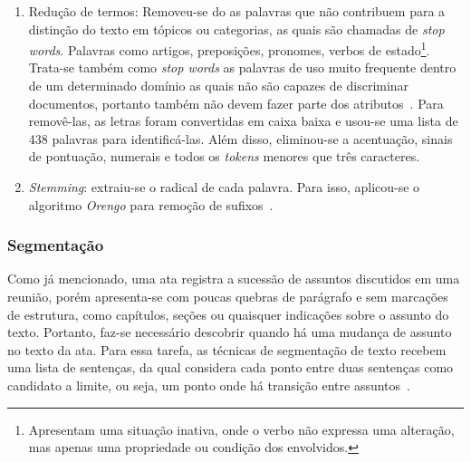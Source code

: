 \begin{enumerate}
\begin{algorithm}
	\caption{Identificação de finais de sentença}
	\label{alg:identificacaofinaisdesent}
\end{algorithm}




\item Redução de termos: Removeu-se do as palavras que não contribuem para a distinção do texto em tópicos ou categorias, as quais são chamadas de \textit{stop words}. Palavras como artigos, preposições, pronomes, verbos de estado\footnote{Apresentam uma situação inativa, onde o verbo não expressa uma alteração, mas apenas uma propriedade ou condição dos envolvidos.}. Trata-se também como \textit{stop words} as palavras de uso muito frequente dentro de um determinado domínio as quais não são capazes de discriminar documentos, portanto também não devem fazer parte dos atributos~\cite{Rezende2003}. Para removê-las, as letras foram convertidas em caixa baixa e usou-se uma lista de 438 palavras para identificá-las. Além disso, eliminou-se a acentuação, sinais de pontuação, numerais e todos os \textit{tokens} menores que três caracteres.

\item \textit{Stemming}: extraiu-se o radical de cada palavra. Para isso, aplicou-se o algoritmo \textit{Orengo} %
	para remoção de sufixos~\cite{Alvares2005}.

\end{enumerate}
	







\subsubsection{Segmentação}

Como já mencionado, uma ata registra a sucessão de assuntos discutidos em uma reunião, porém apresenta-se com poucas quebras de parágrafo e sem marcações de estrutura, como capítulos, seções ou quaisquer indicações sobre o assunto do texto. Portanto, faz-se necessário descobrir quando há uma mudança de assunto no texto da ata. Para essa tarefa, as técnicas de segmentação de texto recebem uma lista de sentenças, da qual considera cada ponto entre duas sentenças como candidato a limite, ou seja, um ponto onde há transição entre assuntos~\cite{Bokaei2015, Bokaei2016, Misra2009, Sakahara2014}.


